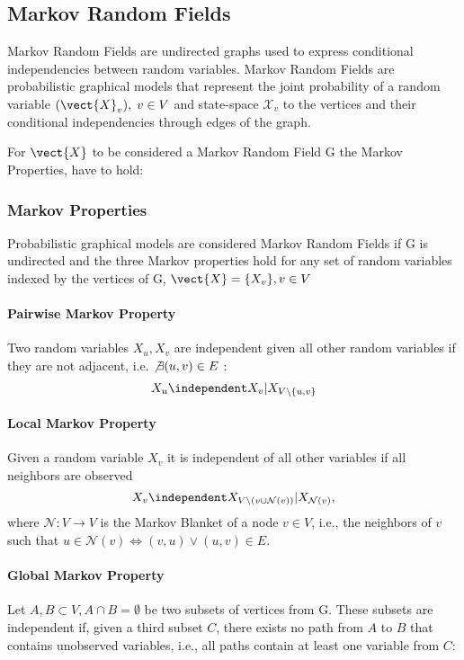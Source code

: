 \subsection{Markov Random Fields}
Markov Random Fields are undirected graphs used to express conditional independencies between random variables. 
Markov Random Fields are probabilistic graphical models that represent the joint probability of a random variable $(\vect{X}_v), \; v \in V$ and state-space $\mathcal{X}_v$ \wrt to the vertices and their conditional independencies through edges of the graph. 

For $\vect{X}$ to be considered a Markov Random Field \wrt G the Markov Properties, have to hold:

\subsubsection*{Markov Properties}
Probabilistic graphical models are considered Markov Random Fields if G is undirected and the three Markov properties hold for any set of random variables indexed by the vertices of G, $\vect{X} = \{X_v\}, v \in V$

\paragraph*{Pairwise Markov Property}
Two random variables $X_u, X_v$ are independent given all other random variables if they are not adjacent, i.e. $\not\exists (u,v) \in E$ :
\begin{equation}
    X_u \independent X_v \lvert X_{V \setminus\{u,v\}}
\end{equation}

\paragraph*{Local Markov Property}
Given a random variable $X_v$ it is independent of all other variables if all neighbors are observed 
\begin{equation}
    X_v \independent X_{V\setminus (v \cup \mathcal{N}(v))} \lvert X_{\mathcal{N}(v)},   
\end{equation}
where $\mathcal{N}: V \rightarrow V$ is the Markov Blanket of a node $v \in V$, i.e., the neighbors of $v$ such that $u \in \mathcal{N}(v) \Leftrightarrow (v,u) \vee (u,v) \in E$.

\paragraph*{Global Markov Property}
Let $A, B \subset V, A \cap B = \emptyset$ be two subsets of vertices from G. 
These subsets are independent if, given a third subset $C$, there exists no path from $A$ to $B$ that contains unobserved variables, i.e., all paths contain at least one variable from $C$:

